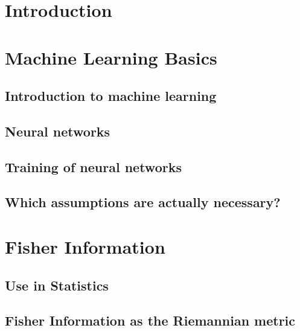 \documentclass[12pt, twoside, a4paper]{report}
\begin{document}
	
	\tableofcontents
	\thispagestyle{plain}
	

	\chapter{Introduction}
	
	
	\chapter{Machine Learning Basics}\label{sec:ChapterMachineLearningBasics}
	\section{Introduction to machine learning}\label{sec:MachineLearningIntroduction}
	
	\section{Neural networks}\label{sec:NeuralNetworks(BigSection)}
	
	\section{Training of neural networks}\label{sec:NeuralNetworkTraining}
	
	\section{Which assumptions are actually necessary?}\label{sec:WhichAssumptionsAreNecessary}
	
	
	
	\chapter{Fisher Information}\label{sec:ChapterFisherInformation}
	
	\section{Use in Statistics}\label{sec:FIinStatistics}
	
	\section{Fisher Information as the Riemannian metric}\label{sec:FisherInformationAsRiemannianMetric(BigChapter)}
	
\end{document}
